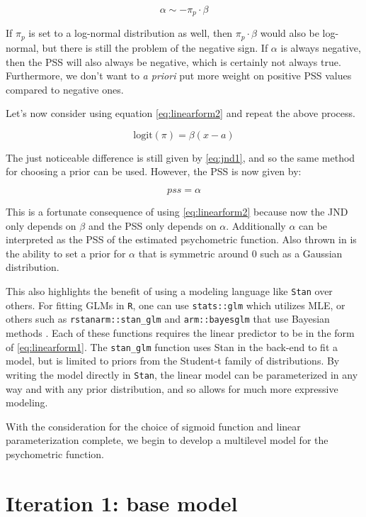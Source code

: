 \documentclass[11pt, oneside, openany]{scrbook}
\begin{document}
\[\alpha \sim -\pi_p \cdot \beta\]

If \(\pi_p\) is set to a log-normal distribution as well, then \(\pi_p \cdot \beta\) would also be log-normal, but there is still the problem of the negative sign. If \(\alpha\) is always negative, then the PSS will also always be negative, which is certainly not always true. Furthermore, we don't want to \emph{a priori} put more weight on positive PSS values compared to negative ones.

Let's now consider using equation \eqref{eq:linearform2} and repeat the above process.

\begin{equation}
  \mathrm{logit}(\pi) = \beta(x - a)
  \label{eq:pfform2}
\end{equation}

The just noticeable difference is still given by \eqref{eq:jnd1}, and so the same method for choosing a prior can be used. However, the PSS is now given by:

\[pss = \alpha\]

This is a fortunate consequence of using \eqref{eq:linearform2} because now the JND only depends on \(\beta\) and the PSS only depends on \(\alpha\). Additionally \(\alpha\) can be interpreted as the PSS of the estimated psychometric function. Also thrown in is the ability to set a prior for \(\alpha\) that is symmetric around \(0\) such as a Gaussian distribution.

This also highlights the benefit of using a modeling language like \texttt{Stan} over others. For fitting GLMs in \texttt{R}, one can use \texttt{stats::glm} which utilizes MLE, or others such as \texttt{rstanarm::stan\_glm} and \texttt{arm::bayesglm} that use Bayesian methods \citep{R-rstanarm, R-arm}. Each of these functions requires the linear predictor to be in the form of \eqref{eq:linearform1}. The \texttt{stan\_glm} function uses Stan in the back-end to fit a model, but is limited to priors from the Student-t family of distributions. By writing the model directly in \texttt{Stan}, the linear model can be parameterized in any way and with any prior distribution, and so allows for much more expressive modeling.

With the consideration for the choice of sigmoid function and linear parameterization complete, we begin to develop a multilevel model for the psychometric function.

\hypertarget{iter1}{%
\section{Iteration 1: base model}\label{iter1}}
\end{document}
